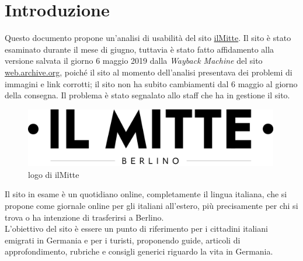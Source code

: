 \newpage
\section{Introduzione}
Questo documento propone un'analisi di usabilità del sito \href{https://ilmitte.com}{ilMitte}. Il sito è stato esaminato durante il mese di giugno, tuttavia è stato fatto affidamento alla versione salvata il giorno 6 maggio 2019 dalla \textit{Wayback Machine} del sito \href{https://web.archive.org/web/}{web.archive.org}, poiché il sito al momento dell'analisi presentava dei problemi di immagini e link corrotti; il sito non ha subito cambiamenti dal 6 maggio al giorno della consegna. Il problema è stato segnalato allo staff che ha in gestione il sito.

\vspace{40pt}
\begin{figure}[htbp]
\begin{center}
\includegraphics[width=30em]{img/logo}
\caption{logo di ilMitte}
\end{center}
\end{figure}
\vspace{30pt}

Il sito in esame è un quotidiano online, completamente il lingua italiana, che si propone come giornale online per gli italiani all'estero, più precisamente per chi si trova o ha intenzione di trasferirsi a Berlino.\\
L'obiettivo del sito è essere un punto di riferimento per i cittadini italiani emigrati in Germania e per i turisti, proponendo guide, articoli di approfondimento, rubriche e consigli generici riguardo la vita in Germania.